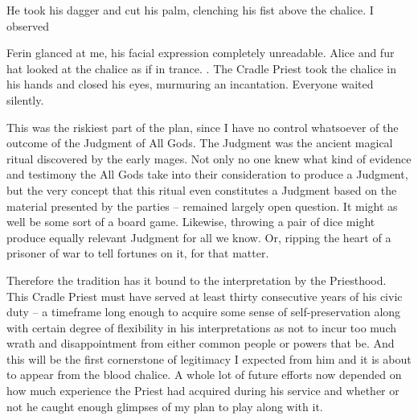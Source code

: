He took his dagger and cut his palm, clenching his fist above the chalice. I observed


 Ferin glanced at me, his facial expression completely unreadable.  Alice and fur hat looked at the chalice as if in trance. . The Cradle Priest took the chalice in his hands and closed his eyes, murmuring an incantation. Everyone waited silently.

This was the riskiest part of the plan, since I have no control whatsoever of the outcome of the Judgment of All Gods. The Judgment was the ancient magical ritual discovered by the early mages. Not only no one knew what kind of evidence and testimony the All Gods take into their consideration to produce a Judgment, but the very concept that this ritual even constitutes a Judgment based on the material presented by the parties -- remained largely open question. It might as well be some sort of a board game. Likewise, throwing a pair of dice might produce equally relevant Judgment for all we know. Or, ripping the heart of a prisoner of war to tell fortunes on it, for that matter.

Therefore the tradition has it bound to the interpretation by the Priesthood. This Cradle Priest must have served at least thirty consecutive years of his civic duty -- a timeframe long enough to acquire some sense of self-preservation along with certain degree of flexibility in his interpretations as not to incur too much wrath and disappointment from either common people or powers that be. And this will be the first cornerstone of legitimacy I expected from him and it is about to appear from the blood chalice. A whole lot of future efforts now depended on how much experience the Priest had acquired during his service and whether or not he caught enough glimpses of my plan to play along with it.

